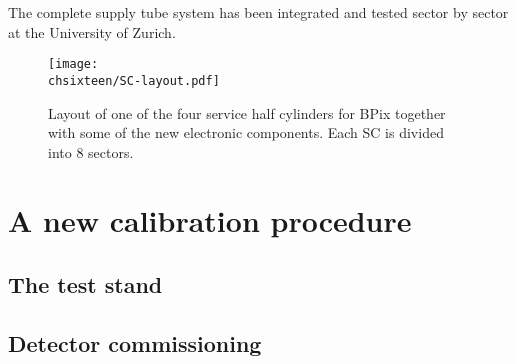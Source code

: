 The complete supply tube system has been integrated and tested sector by sector at the University of Zurich.

\begin{figure}[!htb]
 \begin{center}
 \texttt{[image: \\chsixteen/SC-layout.pdf]}
 \end{center}
 \caption{Layout of one of the four service half cylinders for BPix together with some of the new electronic components. Each SC is divided into 8 sectors.}
 \label{fig:phase1SC}
\end{figure} 
 
\section{A new calibration procedure}

\subsection{The test stand}
\subsection{Detector commissioning}

